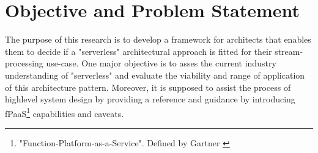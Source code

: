 \section{Objective and Problem Statement}

The purpose of this research is to develop a framework for architects that enables them to decide if a "serverless" architectural approach is fitted for their stream-processing use-case.
One major objective is to asses the current industry understanding of "serverless" and evaluate the viability and range of application of this architecture pattern.
Moreover, it is supposed to assist the process of highlevel system design by providing a reference and guidance by introducing fPaaS\footnote{"Function-Platform-as-a-Service". Defined by Gartner \autocite{Chandrasekaran2017EvolutionWhen}} capabilities and caveats. 

